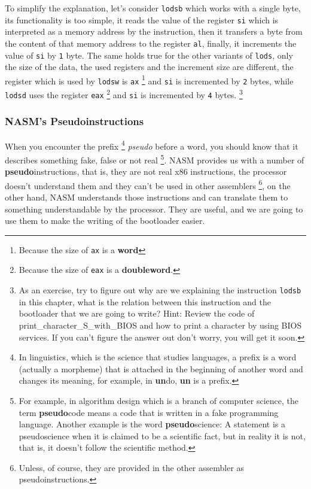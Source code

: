 To simplify the explanation, let's consider \lstinline!lodsb! which
works with a single byte, its functionality is too simple, it reads the
value of the register \lstinline!si! which is interpreted as a memory
address by the instruction, then it transfers a byte from the content of
that memory address to the register \lstinline!al!, finally, it
increments the value of \lstinline!si! by \lstinline!1! byte. The same
holds true for the other variants of \lstinline!lods!, only the size of
the data, the used registers and the increment size are different, the
register which is used by \lstinline!lodsw! is \lstinline!ax! \footnote{Because
  the size of \lstinline!ax! is a \textbf{word}} and \lstinline!si! is
incremented by \lstinline!2! bytes, while \lstinline!lodsd! uses the
register \lstinline!eax! \footnote{Because the size of \lstinline!eax!
  is a \textbf{doubleword}.} and \lstinline!si! is incremented by
\lstinline!4! bytes. \footnote{As an exercise, try to figure out why are
  we explaining the instruction \lstinline!lodsb! in this chapter, what
  is the relation between this instruction and the bootloader that we
  are going to write? Hint: Review the code of
  print\_character\_S\_with\_BIOS and how to print a character by using
  BIOS services. If you can't figure the answer out don't worry, you
  will get it soon.}

\subsubsection{NASM's
Pseudoinstructions}\label{nasms-pseudoinstructions}

When you encounter the prefix \footnote{In linguistics, which is the
  science that studies languages, a prefix is a word (actually a
  morpheme) that is attached in the beginning of another word and
  changes its meaning, for example, in \textbf{un}do, \textbf{un} is a
  prefix.} \emph{pseudo} before a word, you should know that it
describes something fake, false or not real \footnote{For example, in
  algorithm design which is a branch of computer science, the term
  \textbf{pseudo}code means a code that is written in a fake programming
  language. Another example is the word \textbf{pseudo}science: A
  statement is a pseudoscience when it is claimed to be a scientific
  fact, but in reality it is not, that is, it doesn't follow the
  scientific method.}. NASM provides us with a number of
\textbf{pseudo}instructions, that is, they are not real x86
instructions, the processor doesn't understand them and they can't be
used in other assemblers \footnote{Unless, of course, they are provided
  in the other assembler as pseudoinstructions.}, on the other hand,
NASM understands those instructions and can translate them to something
understandable by the processor. They are useful, and we are going to
use them to make the writing of the bootloader easier.

